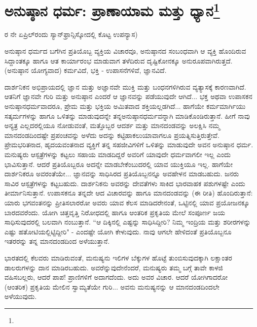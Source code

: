
\chapter[ಅನುಷ್ಠಾನ ಧರ್ಮ: ಪ್ರಾಣಾಯಾಮ ಮತ್ತು ಧ್ಯಾನ]{ಅನುಷ್ಠಾನ ಧರ್ಮ: ಪ್ರಾಣಾಯಾಮ ಮತ್ತು ಧ್ಯಾನ\protect\footnote{}}

\begin{center}
ರ ನೇ ಏಪ್ರಿಲ್‌ರಂದು ಸ್ಯಾನ್‌ಫ್ರಾನ್ಸಿಸ್ಕೋದಲ್ಲಿ ಕೊಟ್ಟ ಉಪನ್ಯಾಸ)
\end{center}

ಅನುಷ್ಠಾನ ಧರ್ಮದ ಬಗೆಗಿನ ಪ್ರತಿಯೊಬ್ಬ ವ್ಯಕ್ತಿಯ ವಿಚಾರವೂ, ಅನುಷ್ಠಾನದ ಸಂಬಂಧವಾಗಿ ಆ ವ್ಯಕ್ತಿ ಹೊಂದಿರುವ ಸಿದ್ದಾಂತಕ್ಕೂ ಹಾಗೂ ಆತ ಕಾರ್ಯಾರಂಭ ಮಾಡುವಾಗ ತಳೆದಿರುವ ದೃಷ್ಟಿಕೋನಕ್ಕೂ ಅನುರೂಪವಾಗಿರುತ್ತದೆ. (ಅನುಷ್ಠಾನ ಯೋಗ್ಯವಾದ) ಕರ್ಮವಿದೆ, ಭಕ್ತಿ - ಉಪಾಸನೆಗಳಿವೆ, ಜ್ಞಾನವಿದೆ.

ದಾರ್ಶನಿಕನ ಅಭಿಪ್ರಾಯದಲ್ಲಿ ಜ್ಞಾನ ಮತ್ತು ಅಜ್ಞಾನವೇ ಮುಕ್ತಿ ಮತ್ತು ಬಂಧನಗಳಿಗಿರುವ ವ್ಯತ್ಯಾಸಕ್ಕೆ ಕಾರಣವಾಗಿದೆ. ಆತನಿಗೆ ಜ್ಞಾನವೇ ಗುರಿ ಮತ್ತು ಅನುಷ್ಠಾನ ಎಂದರೆ ಆ ಜ್ಞಾನವನ್ನು ಪಡೆಯುವುದೇ ಆಗಿದೆ... ಭಕ್ತ ಅಥವಾ ಉಪಾಸಕನ ಅನುಷ್ಠಾನಧರ್ಮವಾದರೂ, ಪ್ರೇಮ ಮತ್ತು ಭಕ್ತಿಯ ಅಮಿತವಾದ ಶಕ್ತಿಯಲ್ಲಡಗಿದೆ... ಹಾಗೆಯೇ ಕರ್ಮಮಾರ್ಗಿಯು ಸತ್ಕರ್ಮಗಳನ್ನು ಹಾಗೂ ಒಳಿತನ್ನು ಮಾಡುವುದನ್ನೇ ತನ್ನ\break ಅನುಷ್ಠಾನಧರ್ಮವನ್ನಾಗಿ ಮಾಡಿಕೊಂಡಿರುತ್ತಾನೆ. ಹೀಗೆ ನಾವು ಅನ್ಯತ್ರ ಎಲ್ಲದರಲ್ಲಿಯೂ ನೋಡುವಂತೆ, ಮತ್ತೊಬ್ಬರ ಆದರ್ಶ ಮತ್ತು ಮಾನದಂಡವನ್ನು ಅಲಕ್ಷಿಸಿ ನಮ್ಮ ಮಾನದಂಡದಿಂದಷ್ಟೇ ಪ್ರಪಂಚವನ್ನು ಅಳೆದು ಅದನ್ನು ಕಟ್ಟಿಹಾಕಲು\break ಯಾವಾಗಲೂ ಪ್ರಯತ್ನಿಸುತ್ತಿರುತ್ತೇವೆ. ಪ್ರೇಮಭರಿತನಾದ, ಹೃದಯವಂತನಾದ ವ್ಯಕ್ತಿಗೆ ತನ್ನ ಸಹಜೀವಿಗಳಿಗೆ ಒಳಿತನ್ನು ಮಾಡುವುದೇ ಅವನ ಅನುಷ್ಠಾನ ಧರ್ಮ. ಮನುಷ್ಯರು ಆಸ್ಪತ್ರೆಗಳನ್ನು ಕಟ್ಟಲು ಸಹಾಯ ಮಾಡದಿದ್ದರೆ ಅವರಿಗೆ ಯಾವುದೇ ಧರ್ಮವಾಗಲೀ ಇಲ್ಲ ಎಂದು ಭಾವಿಸುತ್ತಾನೆ. ಆದರೆ ಪ್ರತಿಯೊಬ್ಬರೂ ಅದನ್ನೇ ಮಾಡಬೇಕೆಂಬುದರಲ್ಲಿ ಯಾವ ಯುಕ್ತಿಯೂ ಇಲ್ಲ. ಹಾಗೆಯೇ ದಾರ್ಶನಿಕರೂ ಅವರಂತೆಯೇ... ಜ್ಞಾನವನ್ನು ಸಾಧಿಸಿರದ ಪ್ರತಿಯೊಬ್ಬನನ್ನೂ ಅವಹೇಳನ ಮಾಡಬಹುದು. ಜನರು  ಸಾವಿರ ಆಸ್ಪತ್ರೆಗಳನ್ನು ಕಟ್ಟಬಹುದು. ದಾರ್ಶನಿಕನು ಅವರನ್ನು ದೇವತೆಗಳು ಸಾಕಿದ ಭಾರವಾಹಕ ಪಶುಗಳಷ್ಟೇ ಎಂದು ತೀರ್ಮಾನಿಸುತ್ತಾನೆ. ಉಪಾಸಕನೂ ತನ್ನದೇ ಆದ ವಿಚಾರವನ್ನು ಹಾಗೂ ಮಾನದಂಡವನ್ನು (ಈ ರೀತಿ) ಹೊಂದಿರುತ್ತಾನೆ: ಯಾರು ಭಗವಂತನನ್ನು ಪ್ರೀತಿಸಲಾರರೋ ಅವರು ಯಾವ ಕೆಲಸ ಮಾಡಿದರೇನಂತೆ, ಒಟ್ಟಿನಲ್ಲಿ ಯಾವ ಪ್ರಯೋಜನಕ್ಕೂ ಬಾರದವರೆಂದು. ಯೋಗಿ ಚಿತ್ತವೃತ್ತಿ ನಿರೋಧದಲ್ಲಿ ಹಾಗೂ ಆಂತರಿಕ ಪ್ರಕೃತಿಯ ಮೇಲೆ ಸಂಪೂರ್ಣ ಜಯ ಸಾಧಿಸುವುದರಲ್ಲಿ ಬಲವಾಗಿ ನಂಬುತ್ತಾನೆ. “ಆ ದಿಕ್ಕಿನಲ್ಲಿ ಎಷ್ಟನ್ನು ಸಾಧಿಸಿದ್ದೀರಿ? ನಿಮ್ಮ ಇಂದ್ರಿಯ ಮತ್ತು ಶರೀರಗಳನ್ನು ಎಷ್ಟು ಹತೋಟಿಯಲ್ಲಿಟ್ಟಿದ್ದೀರಿ" - ಎಂದಷ್ಟೇ ಯೋಗಿ ಕೇಳುವುದು. ನಾವು ಆಗಲೇ ಹೇಳಿದಂತೆ ಪ್ರತಿಯೊಬ್ಬನೂ ಇತರರನ್ನು ತನ್ನ ಮಾನದಂಡದಿಂದ ಅಳೆಯುತ್ತಾನೆ.

\break

ಭಾರತದಲ್ಲಿ ಕೆಲವರು ಮಾಡಿರುವಂತೆ, ಮನುಷ್ಯನು ಇಲಿಗಳ ಬೆಕ್ಕುಗಳ ಹೊಟ್ಟೆ ತುಂಬಿಸುವುದಕ್ಕಾಗಿ ಲಕ್ಷಾಂತರ ಡಾಲರುಗಳನ್ನು ದಾನ ಮಾಡಿರಬಹುದು. ಅವರೆನ್ನುವುದೇನೆಂದರೆ, ಮನುಷ್ಯರು ತಮ್ಮ ಬಗ್ಗೆ ತಾವೇ ಕಾಳಜಿ ವಹಿಸಬಲ್ಲರು, ಆದರೆ ಪಾಪ! ಪ್ರಾಣಿಗಳಿಗೆ ಅದಾಗದೆಂದು. ಅದು ಅವರ ವಿಚಾರ. ಆದರೆ ಯೋಗಿಗಾದರೋ (ಆಂತರಿಕ) ಪ್ರಕೃತಿಯ ಮೇಲಿನ ಸ್ವಾಮ್ಯತೆಯೇ ಗುರಿ... ಅವನು ಮನುಷ್ಯನನ್ನು ಆ ಮಾನದಂಡದಿಂದಲೇ ಅಳೆಯುವುದು.

